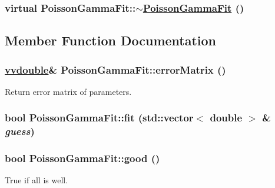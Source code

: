 \hypertarget{classPoissonGammaFit_a1}{
\subsubsection[$\sim$PoissonGammaFit]{\setlength{\rightskip}{0pt plus 5cm}virtual Poisson\-Gamma\-Fit::$\sim$\hyperlink{classPoissonGammaFit}{Poisson\-Gamma\-Fit} ()}}
\label{classPoissonGammaFit_a1}




\subsection{Member Function Documentation}
\hypertarget{classPoissonGammaFit_a8}{
\subsubsection[errorMatrix]{\setlength{\rightskip}{0pt plus 5cm}\hyperlink{PoissonGammaFit_8hpp_a1}{vvdouble}\& Poisson\-Gamma\-Fit::error\-Matrix ()}}
\label{classPoissonGammaFit_a8}


Return error matrix of parameters. 

\hypertarget{classPoissonGammaFit_a3}{
\subsubsection[fit]{\setlength{\rightskip}{0pt plus 5cm}bool Poisson\-Gamma\-Fit::fit (std::vector$<$ double $>$ \& {\em guess})}}
\label{classPoissonGammaFit_a3}


\hypertarget{classPoissonGammaFit_a2}{
\subsubsection[good]{\setlength{\rightskip}{0pt plus 5cm}bool Poisson\-Gamma\-Fit::good ()}}
\label{classPoissonGammaFit_a2}


True if all is well. 

